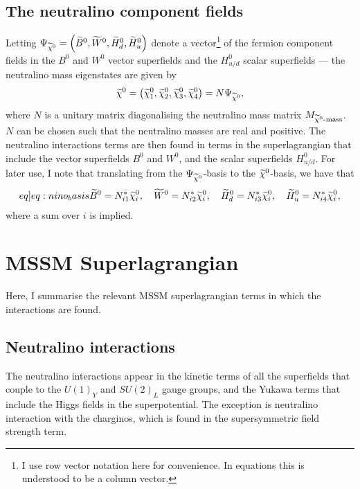 \documentclass[english, notitlepage]{article}
\begin{document}
    \subsection{The neutralino component fields}
        Letting $\Psi_{\nino} = \pclosed{\bino, \wino, \hinod, \hinou}$ denote a vector\footnote{I use row vector notation here for convenience.
            In equations this is understood to be a column vector.}
        of the fermion component fields in the $B^0$ and $W^0$ vector superfields and the $H^0_{u/d}$ scalar superfields --- the neutralino mass eigenstates are given by
        \begin{align}
            \nino = \pclosed{\nino[1], \nino[2], \nino[3], \nino[4]} = N \Psi_{\nino},
        \end{align}
        where $N$ is a unitary matrix diagonalising the neutralino mass matrix $M_{\nino\text{-mass}}$.
        \(N\) can be chosen such that the neutralino masses are real and positive.
        The neutralino interactions terms are then found in terms in the superlagrangian that include the vector superfields $B^0$ and $W^0$, and the scalar superfields $H^0_{u/d}$.
        For later use, I note that translating from the $\Psi_{\nino}$-basis to the $\nino$-basis, we have that
        \begin{align}
            \label[eq]{eq:nino_basis}
            \bino = N_{i1}^\ast \nino[i],\quad \wino = N_{i2}^\ast \nino[i],\quad \hinod = N_{i3}^\ast \nino[i],\quad \hinou = N_{i4}^\ast \nino[i],
        \end{align}
        where a sum over $i$ is implied.

\section{MSSM Superlagrangian}
    Here, I summarise the relevant MSSM superlagrangian terms in which the interactions are found.
    \subsection{Neutralino interactions}
        The neutralino interactions appear in the kinetic terms of all the superfields
        that couple to the $U(1)_Y$ and $SU(2)_L$ gauge groups, and the Yukawa terms
        that include the Higgs fields in the superpotential.
        The exception is neutralino interaction with the charginos, which is found in the supersymmetric field strength term.
\end{document}
